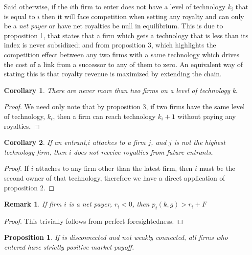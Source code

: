 \documentclass{article}
\newtheorem{corollary}{Corollary}
\newtheorem{proposition}{Proposition}
\newtheorem{remark}{Remark}
\begin{document}
Said otherwise, if the $i$th firm to enter does not have a level of technology $k_i$ that is equal to $i$ then it will face competition when setting any royalty and can only be a \textit{net payer} or have net royalties be null in equilibrium. This is due to proposition 1, that states that a firm which gets a technology that is less than its index is never subsidized; and from proposition 3, which highlights the competition effect between any two firms with a same technology  which drives the cost of a link from a successor to any of them to zero. An equivalent way of stating this is that royalty revenue is maximized by extending the chain.



\begin{corollary}
There are never more than two firms on a level of technology k. 
\end{corollary}

\begin{proof}
We need only note that by proposition 3, if two firms have the same level of technology, $k_i$, then a firm can reach technology $k_i+1$ without paying any royalties. 
\end{proof}

\begin{corollary}
If an entrant,$i$ attaches to a firm $j$, and $j$ is not the highest technology firm, then $i$ does not receive royalties from future entrants. 
\end{corollary}

\begin{proof}
If $i$ attaches to any firm other than the latest firm, then $i$ must be the second owner of that technology, therefore we have a direct application of proposition 2. 
\end{proof}



\begin{remark}
If firm $i$ is a \textit{net payer}, $r_i<0$, then $p_i(k,g)>r_i+F$
\end{remark}

\begin{proof}
This trivially follows from perfect foresightedness.
\end{proof}

\begin{proposition}
If  is disconnected and not weakly connected, all firms who entered have strictly positive market payoff. 
\end{proposition}
\end{document}
